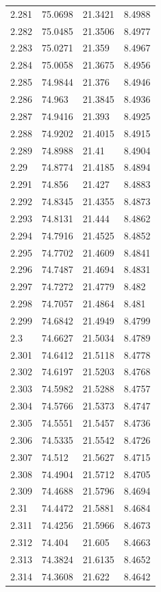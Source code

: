 \begin{tabular}{llll}
2.281 & 75.0698 & 21.3421 & 8.4988 \\
2.282 & 75.0485 & 21.3506 & 8.4977 \\
2.283 & 75.0271 & 21.359 & 8.4967 \\
2.284 & 75.0058 & 21.3675 & 8.4956 \\
2.285 & 74.9844 & 21.376 & 8.4946 \\
2.286 & 74.963 & 21.3845 & 8.4936 \\
2.287 & 74.9416 & 21.393 & 8.4925 \\
2.288 & 74.9202 & 21.4015 & 8.4915 \\
2.289 & 74.8988 & 21.41 & 8.4904 \\
2.29 & 74.8774 & 21.4185 & 8.4894 \\
2.291 & 74.856 & 21.427 & 8.4883 \\
2.292 & 74.8345 & 21.4355 & 8.4873 \\
2.293 & 74.8131 & 21.444 & 8.4862 \\
2.294 & 74.7916 & 21.4525 & 8.4852 \\
2.295 & 74.7702 & 21.4609 & 8.4841 \\
2.296 & 74.7487 & 21.4694 & 8.4831 \\
2.297 & 74.7272 & 21.4779 & 8.482 \\
2.298 & 74.7057 & 21.4864 & 8.481 \\
2.299 & 74.6842 & 21.4949 & 8.4799 \\
2.3 & 74.6627 & 21.5034 & 8.4789 \\
2.301 & 74.6412 & 21.5118 & 8.4778 \\
2.302 & 74.6197 & 21.5203 & 8.4768 \\
2.303 & 74.5982 & 21.5288 & 8.4757 \\
2.304 & 74.5766 & 21.5373 & 8.4747 \\
2.305 & 74.5551 & 21.5457 & 8.4736 \\
2.306 & 74.5335 & 21.5542 & 8.4726 \\
2.307 & 74.512 & 21.5627 & 8.4715 \\
2.308 & 74.4904 & 21.5712 & 8.4705 \\
2.309 & 74.4688 & 21.5796 & 8.4694 \\
2.31 & 74.4472 & 21.5881 & 8.4684 \\
2.311 & 74.4256 & 21.5966 & 8.4673 \\
2.312 & 74.404 & 21.605 & 8.4663 \\
2.313 & 74.3824 & 21.6135 & 8.4652 \\
2.314 & 74.3608 & 21.622 & 8.4642 \\

\end{tabular}
